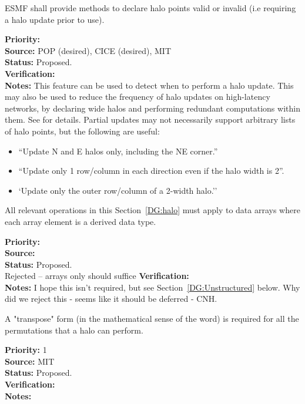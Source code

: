 
ESMF shall provide methods to declare halo points valid or invalid
(i.e requiring a halo update prior to use).

\begin{reqlist}
{\bf Priority:} \\
{\bf Source:} POP (desired), CICE (desired), MIT \\
{\bf Status:} Proposed. \\
{\bf Verification:} \\
{\bf Notes:} This feature can be used to detect when to perform a halo
  update. This may also be used to reduce the frequency of halo
  updates on high-latency networks, by declaring wide halos and
  performing redundant computations within them. See \cite{ref:b2001}
  for details. Partial updates may not necessarily support
  arbitrary lists of halo points, but the following are useful:
  \begin{itemize}
  \item ``Update N and E halos only, including the NE corner.''
  \item ``Update only 1 row/column in each direction even if the halo
    width is 2''.
  \item `Update only the outer row/column of a 2-width halo.''
  \end{itemize}
\end{reqlist}


All relevant operations in this Section~\ref{DG:halo} must apply to
data arrays where each array element is a derived data type.

\begin{reqlist}
{\bf Priority:} \\
{\bf Source:} \\
{\bf Status:} Proposed. \\ Rejected -- arrays only should suffice
{\bf Verification:} \\
{\bf Notes:} I hope this isn't required, but see
  Section~\ref{DG:Unstructured} below.
  Why did we reject this - seems like it should be deferred - CNH.
\end{reqlist}

A "transpose" form (in the mathematical sense of the word) is required
for all the permutations that a halo can perform.
\begin{reqlist}
{\bf Priority:} 1 \\ 
{\bf Source:}  MIT \\
{\bf Status:} Proposed. \\
{\bf Verification:} \\
{\bf Notes:}
\end{reqlist}

